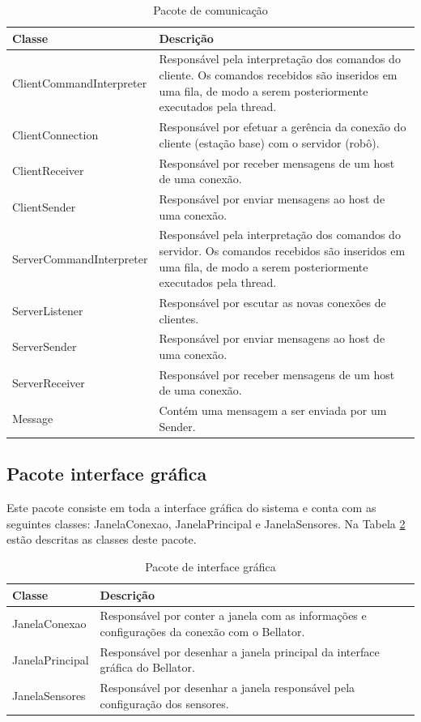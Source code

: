 \begin{table}[h]
  \centering
  \caption{Pacote de comunicação}
    \begin{tabular}{p{6cm}p{8cm}}
    \toprule
    \textbf{Classe} & \textbf{Descrição} \\ \hline
    \midrule
    ClientCommandInterpreter & Responsável pela interpretação dos comandos do cliente. Os comandos recebidos são inseridos em uma fila, de modo a serem posteriormente executados pela thread. \\ \hline
    ClientConnection & Responsável por efetuar a gerência da conexão do cliente (estação base) com o servidor (robô). \\ \hline
    ClientReceiver & Responsável por receber mensagens de um host de uma conexão. \\ \hline
    ClientSender & Responsável por enviar mensagens ao host de uma conexão. \\ \hline
    ServerCommandInterpreter & Responsável pela interpretação dos comandos do servidor. Os comandos recebidos são inseridos em uma fila, de modo a serem posteriormente executados pela thread. \\ \hline
    ServerListener & Responsável por escutar as novas conexões de clientes. \\ \hline
    ServerSender & Responsável por enviar mensagens ao host de uma conexão. \\ \hline
    ServerReceiver & Responsável por receber mensagens de um host de uma conexão. \\ \hline
    Message & Contém uma mensagem a ser enviada por um Sender. \\ \hline
    \bottomrule
    \end{tabular}%
  \label{tab:pacote_comunicacao}%
\end{table}%

\subsection{Pacote interface gráfica}

Este pacote consiste em toda a interface gráfica do sistema e conta com as seguintes classes: JanelaConexao, JanelaPrincipal e JanelaSensores. Na Tabela \ref{tab:pacote_interface_grafica} estão descritas as classes deste pacote.

\begin{table}[h]
  \centering
  \caption{Pacote de interface gráfica}
    \begin{tabular}{p{6cm}p{8cm}}
    \toprule
    \textbf{Classe} & \textbf{Descrição} \\ \hline
    \midrule
    JanelaConexao & Responsável por conter a janela com as informações e configurações da conexão com o Bellator. \\ \hline
    JanelaPrincipal & Responsável por desenhar a janela principal da interface gráfica do Bellator. \\ \hline
    JanelaSensores & Responsável por desenhar a janela responsável pela configuração dos sensores. \\ \hline
    \bottomrule
    \end{tabular}%
  \label{tab:pacote_interface_grafica}%
\end{table}%

